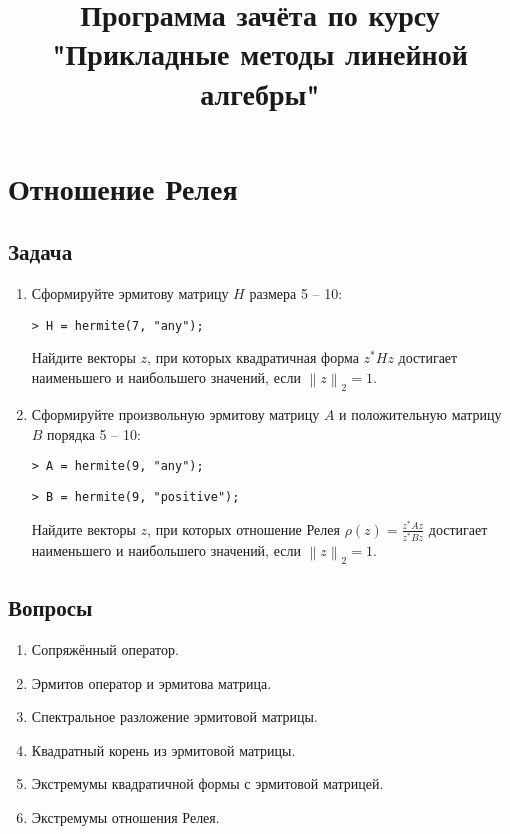 \documentclass[a4paper,12pt]{article}
\newenvironment{Matlab}{\par \vspace{0.2cm}}{\vspace{0.2cm} \par}
\newcommand{\Mcommand}[1]{\noindent \texttt{> #1} \par}
\newcommand{\matlab}[1]{\begin{Matlab} \Mcommand{#1} \end{Matlab}}
\newcommand{\snorm}[1]{\left\| #1 \right\|_2}
\begin{document}
\title{Программа зачёта по курсу \\ "Прикладные методы линейной алгебры"}
\date{}
\author{}
\maketitle

\section{Отношение Релея}

\subsection{Задача}

\begin{enumerate}
    \item Сформируйте эрмитову матрицу $H$ размера 5 -- 10:
          \matlab{H = hermite(7, "any");}
          Найдите векторы $z$, при которых квадратичная форма $z^* H z$ достигает наименьшего и наибольшего значений, если $\snorm{z}=1$.

    \item Сформируйте произвольную эрмитову матрицу $A$ и положительную матрицу $B$ порядка 5 -- 10:
          \begin{Matlab}
              \Mcommand{A = hermite(9, "any");}
              \Mcommand{B = hermite(9, "positive");}
          \end{Matlab}
          Найдите векторы $z$, при которых отношение Релея $\rho(z) = \frac{z^* A z}{z^* B z}$ достигает наименьшего и наибольшего значений,
          если $\snorm{z}=1$.
\end{enumerate}

\subsection{Вопросы}

\begin{enumerate}
    \item Сопряжённый оператор.
    \item Эрмитов оператор и эрмитова матрица.
    \item Спектральное разложение эрмитовой матрицы.
    \item Квадратный корень из эрмитовой матрицы.
    \item Экстремумы квадратичной формы с эрмитовой матрицей.
    \item Экстремумы отношения Релея.
\end{enumerate}
\end{document}
